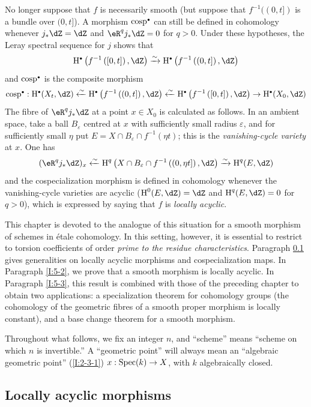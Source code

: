No longer suppose that $f$ is necessarily smooth (but suppose that
$f^{-1}((0,t])$ is a bundle over $(0,t]$). A morphism
$\cosp^\bullet$ can still be defined in cohomology whenever
$j_*\dZ=\dZ$ and $\eR^qj_*\dZ=0$ for $q>0$. Under these hypotheses,
the Leray spectral sequence for $j$ shows that
\[
  \h^\bullet\left(f^{-1}\left([0,t]\right),\dZ\right) \iso \h^\bullet\left(f^{-1}\left((0,t]\right),\dZ\right)
\]
and $\cosp^\bullet$ is the composite morphism
\[
  \cosp^\bullet : \h^\bullet(X_t,\dZ)
    \xleftarrow\sim \h^\bullet\left(f^{-1}\left((0,t]\right),\dZ\right)
    \xleftarrow\sim \h^\bullet\left(f^{-1}\left([0,t]\right),\dZ\right)
    \to \h^\bullet(X_0,\dZ)
\]
The fibre of $\eR^qj_*\dZ$ at a point $x\in X_0$ is calculated as
follows. In an ambient space, take a ball $B_\varepsilon$ centred at $x$
with sufficiently small radius $\varepsilon$, and for sufficiently small
$\eta$ put $E=X\cap B_\varepsilon\cap f^{-1}(\eta t)$; this is the
\emph{vanishing-cycle variety} at $x$. One has
\[
  (\eR^q j_* \dZ)_x \xleftarrow\sim \h^q\left(X\cap B_\varepsilon\cap f^{-1}\left((0,\eta t]\right),\dZ\right) \xrightarrow\sim \h^q(E,\dZ)
\]
and the cospecialization morphism is defined in cohomology whenever the
vanishing-cycle varieties are acyclic
($\h^0(E,\dZ)=\dZ$ and $\h^q(E,\dZ)=0$ for $q>0$), which is expressed
by saying that $f$ is \emph{locally acyclic}.

This chapter is devoted to the analogue of this situation for a smooth
morphism of schemes in étale cohomology. In this setting, however, it is
essential to restrict to torsion coefficients of order \emph{prime to the
residue characteristics}. Paragraph \ref{I:5-1} gives generalities on
locally acyclic morphisms and cospecialization maps. In Paragraph
\ref{I:5-2}, we prove that a smooth morphism is locally acyclic. In
Paragraph \ref{I:5-3}, this result is combined with those of the preceding
chapter to obtain two applications: a specialization theorem for
cohomology groups (the cohomology of the geometric fibres of a smooth
proper morphism is locally constant), and a base change theorem for a
smooth morphism.

Throughout what follows, we fix an integer $n$, and “scheme” means
“scheme on which $n$ is invertible.” A “geometric point” will always mean
an “algebraic geometric point” (\ref{I:2-3-1})
$x:\operatorname{Spec}(k)\to X$, with $k$ algebraically closed.

\subsection{Locally acyclic morphisms}\label{I:5-1}

